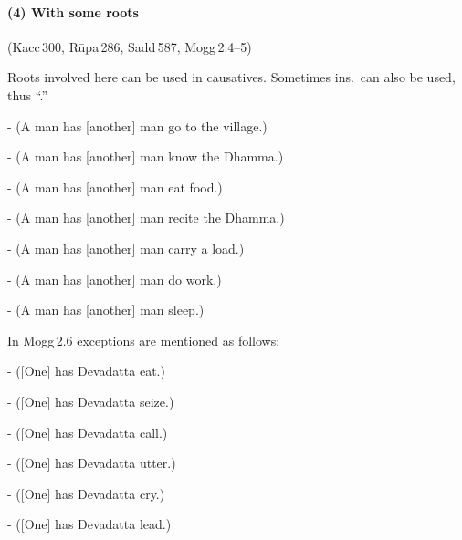 \paragraph*{(4) With some roots} (Kacc\,300, R\=upa\,286, Sadd\,587, Mogg\,2.4--5)\par
Roots involved here can be used in causatives. Sometimes ins.\ can also be used, thus ``.''\par
-  (A man has [another] man go to the village.)\par
-  (A man has [another] man know the Dhamma.)\par
-  (A man has [another] man eat food.)\par
-  (A man has [another] man recite the Dhamma.)\par
-  (A man has [another] man carry a load.)\par
-  (A man has [another] man do work.)\par
-  (A man has [another] man sleep.)\par
In Mogg\,2.6 exceptions are mentioned as follows:\par
-  ([One] has Devadatta eat.)\par
-  ([One] has Devadatta seize.)\par
-  ([One] has Devadatta call.)\par
-  ([One] has Devadatta utter.)\par
-  ([One] has Devadatta cry.)\par
-  ([One] has Devadatta lead.)\par

